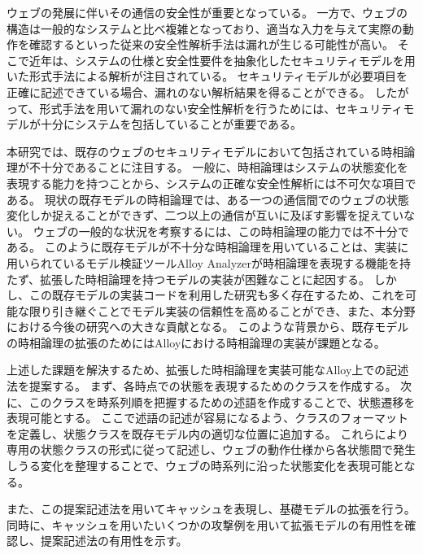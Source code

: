 \documentclass[12pt,a4paper]{jbook}
\begin{document}
ウェブの発展に伴いその通信の安全性が重要となっている。
一方で、ウェブの構造は一般的なシステムと比べ複雑となっており、適当な入力を与えて実際の動作を確認するといった従来の安全性解析手法は漏れが生じる可能性が高い。
そこで近年は、システムの仕様と安全性要件を抽象化したセキュリティモデルを用いた形式手法による解析が注目されている。
セキュリティモデルが必要項目を正確に記述できている場合、漏れのない解析結果を得ることができる。
したがって、形式手法を用いて漏れのない安全性解析を行うためには、セキュリティモデルが十分にシステムを包括していることが重要である。

本研究では、既存のウェブのセキュリティモデルにおいて包括されている時相論理が不十分であることに注目する。
一般に、時相論理はシステムの状態変化を表現する能力を持つことから、システムの正確な安全性解析には不可欠な項目である。
現状の既存モデルの時相論理では、ある一つの通信間でのウェブの状態変化しか捉えることができず、二つ以上の通信が互いに及ぼす影響を捉えていない。
ウェブの一般的な状況を考察するには、この時相論理の能力では不十分である。
このように既存モデルが不十分な時相論理を用いていることは、実装に用いられているモデル検証ツールAlloy Analyzerが時相論理を表現する機能を持たず、拡張した時相論理を持つモデルの実装が困難なことに起因する。
しかし、この既存モデルの実装コードを利用した研究も多く存在するため、これを可能な限り引き継ぐことでモデル実装の信頼性を高めることができ、また、本分野における今後の研究への大きな貢献となる。
このような背景から、既存モデルの時相論理の拡張のためにはAlloyにおける時相論理の実装が課題となる。

上述した課題を解決するため、拡張した時相論理を実装可能なAlloy上での記述法を提案する。
まず、各時点での状態を表現するためのクラスを作成する。
次に、このクラスを時系列順を把握するための述語を作成することで、状態遷移を表現可能とする。
ここで述語の記述が容易になるよう、クラスのフォーマットを定義し、状態クラスを既存モデル内の適切な位置に追加する。
これらにより専用の状態クラスの形式に従って記述し、ウェブの動作仕様から各状態間で発生しうる変化を整理することで、ウェブの時系列に沿った状態変化を表現可能となる。

また、この提案記述法を用いてキャッシュを表現し、基礎モデルの拡張を行う。
同時に、キャッシュを用いたいくつかの攻撃例を用いて拡張モデルの有用性を確認し、提案記述法の有用性を示す。
\end{document}

